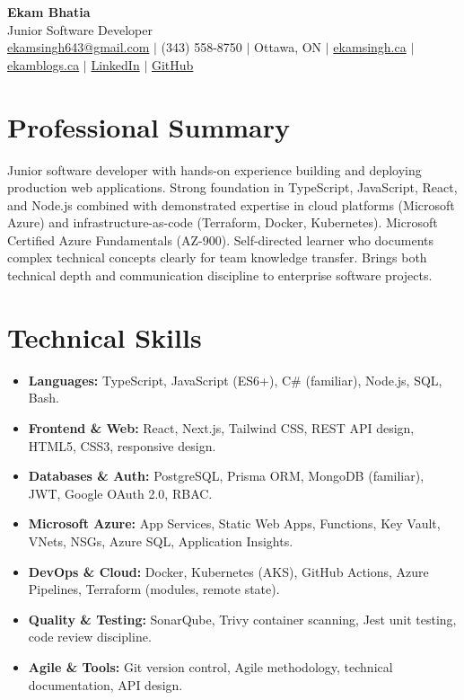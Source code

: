 \documentclass[11pt,a4paper]{article}
\begin{document}
\begin{center}
    {\LARGE \textbf{Ekam Bhatia}} \\
    \vspace{2pt}
    {\normalsize Junior Software Developer} \\
    \vspace{4pt}
    \small
    \href{mailto:ekamsingh643@gmail.com}{ekamsingh643@gmail.com} $|$
    (343) 558-8750 $|$ Ottawa, ON $|$
    \href{https://www.ekamsingh.ca}{ekamsingh.ca} $|$
    \href{https://www.ekamblogs.ca}{ekamblogs.ca} $|$
    \href{https://www.linkedin.com/in/ekam-bhatia-335840168}{LinkedIn} $|$
    \href{https://github.com/bhat0155}{GitHub}
\end{center}

\section{Professional Summary}
Junior software developer with hands-on experience building and deploying production web applications. Strong foundation in TypeScript, JavaScript, React, and Node.js combined with demonstrated expertise in cloud platforms (Microsoft Azure) and infrastructure-as-code (Terraform, Docker, Kubernetes). Microsoft Certified Azure Fundamentals (AZ-900). Self-directed learner who documents complex technical concepts clearly for team knowledge transfer. Brings both technical depth and communication discipline to enterprise software projects.

\section{Technical Skills}
\begin{itemize}
    \item \textbf{Languages:} TypeScript, JavaScript (ES6+), C\# (familiar), Node.js, SQL, Bash.
    \item \textbf{Frontend \& Web:} React, Next.js, Tailwind CSS, REST API design, HTML5, CSS3, responsive design.
    \item \textbf{Databases \& Auth:} PostgreSQL, Prisma ORM, MongoDB (familiar), JWT, Google OAuth 2.0, RBAC.
    \item \textbf{Microsoft Azure:} App Services, Static Web Apps, Functions, Key Vault, VNets, NSGs, Azure SQL, Application Insights.
    \item \textbf{DevOps \& Cloud:} Docker, Kubernetes (AKS), GitHub Actions, Azure Pipelines, Terraform (modules, remote state).
    \item \textbf{Quality \& Testing:} SonarQube, Trivy container scanning, Jest unit testing, code review discipline.
    \item \textbf{Agile \& Tools:} Git version control, Agile methodology, technical documentation, API design.
\end{itemize}
\end{document}
